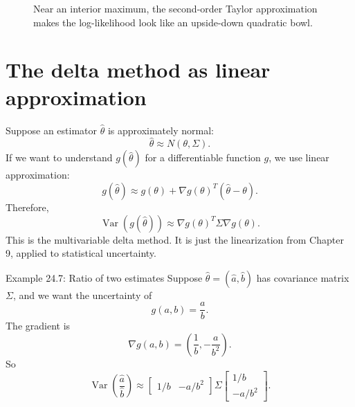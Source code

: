 \documentclass[11pt,oneside]{book}
\newcommand{\Var}{\operatorname{Var}}
\newcommand{\grad}{\nabla}
\begin{document}
\begin{figure}[H]
\centering
{}
\caption{Near an interior maximum, the second-order Taylor approximation makes the log-likelihood look like an upside-down quadratic bowl.}
\end{figure}

\section{The delta method as linear approximation}

Suppose an estimator $\hat\theta$ is approximately normal:
\[
\hat\theta\approx N(\theta,\Sigma).
\]
If we want to understand $g(\hat\theta)$ for a differentiable function $g$, we use linear approximation:
\[
g(\hat\theta)\approx g(\theta)+\grad g(\theta)^T(\hat\theta-\theta).
\]
Therefore,
\[
\Var(g(\hat\theta))\approx \grad g(\theta)^T\Sigma\grad g(\theta).
\]
This is the multivariable delta method. It is just the linearization from Chapter 9, applied to statistical uncertainty.

\begin{examplebox}{Example 24.7: Ratio of two estimates}
Suppose $\hat\theta=(\hat a,\hat b)$ has covariance matrix $\Sigma$, and we want the uncertainty of
\[
g(a,b)=\frac{a}{b}.
\]
The gradient is
\[
\grad g(a,b)=\left(\frac1b,-\frac{a}{b^2}\right).
\]
So
\[
\Var\left(\frac{\hat a}{\hat b}\right)\approx
\begin{bmatrix}1/b & -a/b^2\end{bmatrix}
\Sigma
\begin{bmatrix}1/b\\ -a/b^2\end{bmatrix}.
\]
\end{examplebox}
\end{document}
